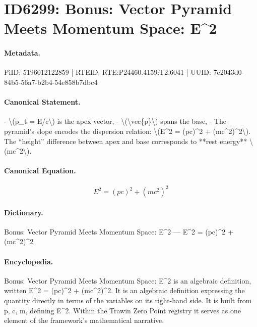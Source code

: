 \section*{ID6299: Bonus: Vector Pyramid Meets Momentum Space: E\textasciicircum{}2}
\paragraph{Metadata.}
PiID: 5196012122859 | RTEID: RTE:P24460.4159:T2.6041 | UUID: 7e2043d0-84b5-56a7-b2b4-54e858b7dbc4

\paragraph{Canonical Statement.}
- \textbackslash{}(p\_t = E/c\textbackslash{}) is the apex vector, - \textbackslash{}(\textbackslash{}vec\{p\}\textbackslash{}) spans the base, - The pyramid’s slope encodes the dispersion relation: \textbackslash{}(E\textasciicircum{}2 = (pc)\textasciicircum{}2 + (mc\textasciicircum{}2)\textasciicircum{}2\textbackslash{}). The “height” difference between apex and base corresponds to **rest energy** \textbackslash{}(mc\textasciicircum{}2\textbackslash{}).

\paragraph{Canonical Equation.}
\[
E^2 = (pc)^2 + (mc^2)^2
\]

\paragraph{Dictionary.}
Bonus: Vector Pyramid Meets Momentum Space: E\textasciicircum{}2 — E\textasciicircum{}2 = (pc)\textasciicircum{}2 + (mc\textasciicircum{}2)\textasciicircum{}2

\paragraph{Encyclopedia.}
Bonus: Vector Pyramid Meets Momentum Space: E\textasciicircum{}2 is an algebraic definition, written E\textasciicircum{}2 = (pc)\textasciicircum{}2 + (mc\textasciicircum{}2)\textasciicircum{}2. It is an algebraic definition expressing the quantity directly in terms of the variables on its right-hand side. It is built from p, c, m, defining E\textasciicircum{}2. Within the Trawin Zero Point registry it serves as one element of the framework's mathematical narrative.
